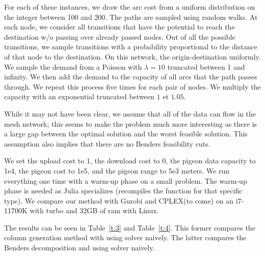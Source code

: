 \documentclass{article}
\begin{document}
    For each of these instances, we draw the arc cost from a uniform distribution on the integer between 100 and 200. The paths are sampled using random walks. At each node, we consider all transitions that have the potential to reach the destination w/o passing over already passed nodes. Out of all the possible transitions, we sample transitions with a probability proportional to the distance of that node to the destination. On this network, the origin-destination uniformly. We sample the demand from a Poisson with $\lambda=10$ truncated between 1 and infinity. We then add the demand to the capacity of all arcs that the path passes through. We repeat this process five times for each pair of nodes. We multiply the capacity with an exponential truncated between $1$ et $1.05$.


    While it may not have been clear, we assume that all of the data can flow in the mesh network; this seems to make the problem much more interesting as there is a large gap between the optimal solution and the worst feasible solution. This assumption also implies that there are no Benders feasibility cuts.


    We set the upload cost to 1, the download cost to 0, the pigeon data capacity to 1e4, the pigeon cost to 1e5, and the pigeon range to 5e3 meters. We run everything one time with a warm-up phase on a small problem. The warm-up phase is needed as Julia specializes (recompiles the function for that specific type). We compare our method with Gurobi and CPLEX(to come) on an i7-11700K with turbo and 32GB of ram with Linux.

	The results can be seen in Table~\ref{t:3} and Table~\ref{t:4}. This former compares the column generation method with using solver naively. The latter compares the Benders decomposition and using solver naively.
\end{document}
